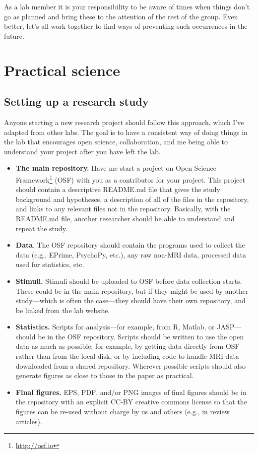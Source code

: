 \documentclass[letterpaper,12pt,oneside]{memoir}
\begin{document}
As a lab member it is your responsibility to be aware of times when things don't go as planned and bring these to the attention of the rest of the group. Even better, let's all work together to find ways of preventing such occurrences in the future.


\section{Practical science}

\subsection{Setting up a research study}

Anyone starting a new research project should follow this approach, which I've adapted from other labs. The goal is to have a consistent way of doing things in the lab that encourages open science, collaboration, and me being able to understand your project after you have left the lab.

\begin{itemize}
\item \textbf{The main repository.} Have me start a project on Open Science Framework\footnote{\url{http://osf.io}} (OSF) with you as a contributor for your project. This project should contain a descriptive README.md file that gives the study background and hypotheses, a description of all of the files in the repository, and links to any relevant files not in the repository. Basically, with the README.md file, another researcher should be able to understand and repeat the study.

\item \textbf{Data}. The OSF repository should contain the programs used to collect the data (e.g., EPrime, PsychoPy, etc.), any raw non-MRI data, processed data used for statistics, etc.

\item \textbf{Stimuli.} Stimuli should be uploaded to OSF before data collection starts. These could be in the main repository, but if they might be used by another study---which is often the case---they should have their own repository, and be linked from the lab website.

\item \textbf{Statistics.} Scripts for analysis---for example, from R, Matlab, or JASP---should be in the OSF repository. Scripts should be written to use the open data as much as possible; for example, by getting data directly from OSF rather than from the local disk, or by including code to handle MRI data downloaded from a shared repository. Wherever possible scripts should also generate figures as close to those in the paper as practical.

\item \textbf{Final figures.} EPS, PDF, and/or PNG images of final figures should be in the repository with an explicit CC-BY creative commons license so that the figures can be re-used without charge by us and others (e.g., in review articles).

\end{itemize}
\end{document}
